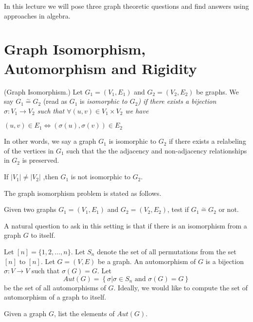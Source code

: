 
In this lecture we will pose three graph theoretic questions and find answers using approaches in algebra.

\section{Graph Isomorphism, Automorphism and Rigidity}

\begin{definition}(Graph Isomorphism.)
Let $G_1=(V_1,E_1)$ and $G_2=(V_2,E_2)$ be graphs. We say $G_1\stackrel{\sim}{=}G_2$ (read as $G_1$ is \em isomorphic to $G_2$) if there exists a bijection $\sigma : V_1\rightarrow V_2$ such that $\forall (u,v) \in V_1\times V_2$ we have

\begin{center}
$(u,v)\in E_1 \iff (\sigma(u),\sigma(v))\in E_2$
\end{center}
\end{definition}

In other words, we say a graph $G_1$ is isomorphic to $G_2$ if there exists a relabeling of the vertices in $G_1$  such that the the adjacency and non-adjacency relationships in $G_2$ is preserved. 
\begin{observation}
If $|V_1|\neq |V_2|$ ,then $G_1$ is not isomorphic to $G_2$.
\end{observation}

The graph isomorphism problem is stated as follows. 

\begin{problem}
Given two graphs $G_1=(V_1,E_1)$ and $G_2=(V_2,E_2)$, test if $G_1\stackrel{\sim}{=}G_2$ or not.
\end{problem}

A natural question to ask in this setting is that if there is an isomorphism from a graph $G$ to itself. 

Let $[n]=\{1,2,\ldots,n\}$. Let $S_n$ denote the set of all permutations from the set $[n]$ to $[n]$. Let $G=(V,E)$ be a graph. An automorphism of $G$ is a bijection $\sigma:V\rightarrow V$ such that $\sigma(G)= G$. Let
$$Aut(G)= \left\{\sigma | \sigma\in S_n \text{~and~} \sigma(G)= G \right\}$$
be the set of all automorphisms of $G$. Ideally, we would like to compute the set of automorphism of a graph to itself.

\begin{problem}
Given a graph $G$, list the elements of $Aut(G)$.
\end{problem}

